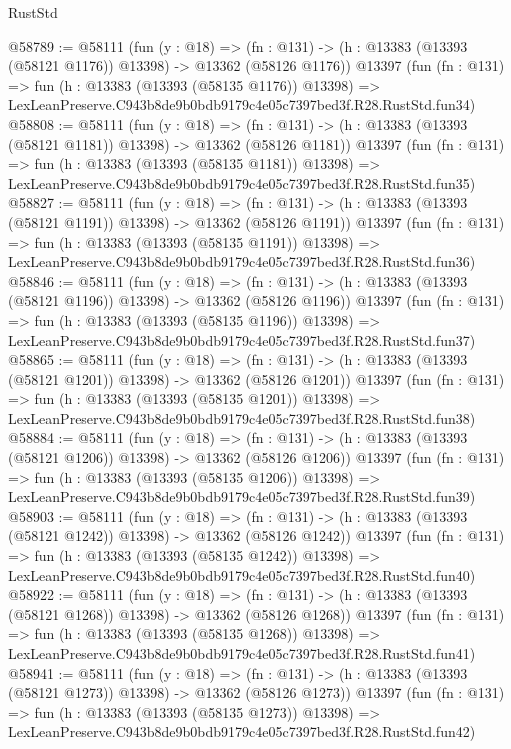 \begin{lexlean}{RustStd}
\begin{coremodule}
@58789 := @58111
    (fun (y : @18) =>
    (fn : @131) -> (h : @13383 (@13393 (@58121 @1176)) @13398) -> @13362 (@58126 @1176))
    @13397
    (fun (fn : @131) =>
    fun (h : @13383 (@13393 (@58135 @1176)) @13398) =>
    LexLeanPreserve.C943b8de9b0bdb9179c4e05c7397bed3f.R28.RustStd.fun34)
@58808 := @58111
    (fun (y : @18) =>
    (fn : @131) -> (h : @13383 (@13393 (@58121 @1181)) @13398) -> @13362 (@58126 @1181))
    @13397
    (fun (fn : @131) =>
    fun (h : @13383 (@13393 (@58135 @1181)) @13398) =>
    LexLeanPreserve.C943b8de9b0bdb9179c4e05c7397bed3f.R28.RustStd.fun35)
@58827 := @58111
    (fun (y : @18) =>
    (fn : @131) -> (h : @13383 (@13393 (@58121 @1191)) @13398) -> @13362 (@58126 @1191))
    @13397
    (fun (fn : @131) =>
    fun (h : @13383 (@13393 (@58135 @1191)) @13398) =>
    LexLeanPreserve.C943b8de9b0bdb9179c4e05c7397bed3f.R28.RustStd.fun36)
@58846 := @58111
    (fun (y : @18) =>
    (fn : @131) -> (h : @13383 (@13393 (@58121 @1196)) @13398) -> @13362 (@58126 @1196))
    @13397
    (fun (fn : @131) =>
    fun (h : @13383 (@13393 (@58135 @1196)) @13398) =>
    LexLeanPreserve.C943b8de9b0bdb9179c4e05c7397bed3f.R28.RustStd.fun37)
@58865 := @58111
    (fun (y : @18) =>
    (fn : @131) -> (h : @13383 (@13393 (@58121 @1201)) @13398) -> @13362 (@58126 @1201))
    @13397
    (fun (fn : @131) =>
    fun (h : @13383 (@13393 (@58135 @1201)) @13398) =>
    LexLeanPreserve.C943b8de9b0bdb9179c4e05c7397bed3f.R28.RustStd.fun38)
@58884 := @58111
    (fun (y : @18) =>
    (fn : @131) -> (h : @13383 (@13393 (@58121 @1206)) @13398) -> @13362 (@58126 @1206))
    @13397
    (fun (fn : @131) =>
    fun (h : @13383 (@13393 (@58135 @1206)) @13398) =>
    LexLeanPreserve.C943b8de9b0bdb9179c4e05c7397bed3f.R28.RustStd.fun39)
@58903 := @58111
    (fun (y : @18) =>
    (fn : @131) -> (h : @13383 (@13393 (@58121 @1242)) @13398) -> @13362 (@58126 @1242))
    @13397
    (fun (fn : @131) =>
    fun (h : @13383 (@13393 (@58135 @1242)) @13398) =>
    LexLeanPreserve.C943b8de9b0bdb9179c4e05c7397bed3f.R28.RustStd.fun40)
@58922 := @58111
    (fun (y : @18) =>
    (fn : @131) -> (h : @13383 (@13393 (@58121 @1268)) @13398) -> @13362 (@58126 @1268))
    @13397
    (fun (fn : @131) =>
    fun (h : @13383 (@13393 (@58135 @1268)) @13398) =>
    LexLeanPreserve.C943b8de9b0bdb9179c4e05c7397bed3f.R28.RustStd.fun41)
@58941 := @58111
    (fun (y : @18) =>
    (fn : @131) -> (h : @13383 (@13393 (@58121 @1273)) @13398) -> @13362 (@58126 @1273))
    @13397
    (fun (fn : @131) =>
    fun (h : @13383 (@13393 (@58135 @1273)) @13398) =>
    LexLeanPreserve.C943b8de9b0bdb9179c4e05c7397bed3f.R28.RustStd.fun42)

\end{coremodule}
\end{lexlean}
